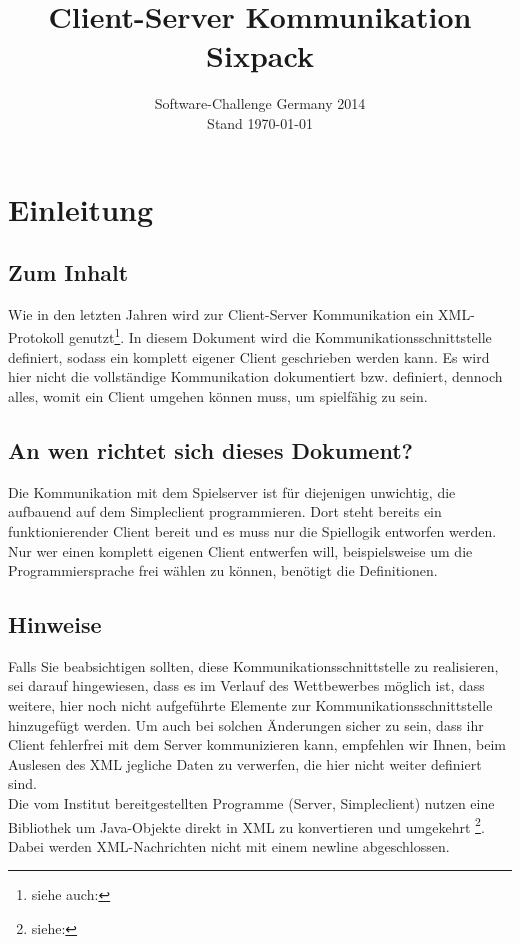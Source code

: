 \documentclass[12pt,a4paper, ngerman, oneside]{scrartcl}
\date{Software-Challenge Germany 2014\\Stand \today}
\title{Client-Server Kommunikation Sixpack}
\begin{document}
\maketitle
\thispagestyle{empty}
\tableofcontents
\thispagestyle{empty}
\newpage
\setcounter{page}{1}
\section{Einleitung}
\subsection*{Zum Inhalt} Wie in den letzten Jahren wird zur Client-Server
Kommunikation ein XML-Protokoll genutzt\footnote{siehe auch:
}. In diesem
Dokument wird die Kommunikationsschnittstelle definiert, sodass ein komplett
eigener Client geschrieben werden kann. Es wird hier nicht die vollständige
Kommunikation dokumentiert bzw. definiert, dennoch alles, womit ein Client
umgehen können muss, um spielfähig zu sein.
\subsection*{An wen richtet sich dieses Dokument?} Die Kommunikation mit dem
Spielserver ist für diejenigen unwichtig, die aufbauend auf dem Simpleclient
programmieren. Dort steht bereits ein funktionierender Client bereit
und es muss nur die Spiellogik entworfen werden. \\
Nur wer einen komplett eigenen Client entwerfen will, beispielsweise um die
Programmiersprache frei wählen zu können, benötigt die Definitionen.

\subsection*{Hinweise} Falls Sie beabsichtigen sollten, diese
Kommunikationsschnittstelle zu realisieren, sei darauf hingewiesen, dass es im
Verlauf des Wettbewerbes möglich ist, dass weitere, hier noch nicht aufgeführte
Elemente zur Kommunikationsschnittstelle hinzugefügt werden. Um auch bei solchen
Änderungen sicher zu sein, dass ihr Client fehlerfrei mit dem Server
kommunizieren kann, empfehlen wir Ihnen, beim Auslesen des XML jegliche Daten zu
verwerfen, die hier nicht weiter definiert sind. \bigskip \\
Die vom Institut bereitgestellten Programme (Server, Simpleclient) nutzen eine
Bibliothek um Java-Objekte direkt in XML zu konvertieren und umgekehrt \footnote{siehe: }. 
Dabei werden XML-Nachrichten nicht mit einem newline abgeschlossen.
\end{document}
